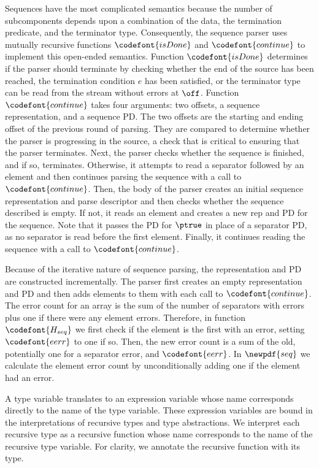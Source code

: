 Sequences have the most complicated semantics because the number of
subcomponents depends upon a combination of the data, the termination
predicate, and the terminator type. Consequently, the sequence parser
uses mutually recursive functions $\codefont{isDone}$ and
$\codefont{continue}$ to implement this open-ended semantics.
Function $\codefont{isDone}$ determines if the parser should terminate
by checking whether the end of the source has been reached, the
termination condition $e$ has been satisfied, or the terminator type
can be read from the stream without errors at $\off$.  Function
$\codefont{continue}$ takes four arguments: two offsets, a sequence
representation, and a sequence PD.  The two offsets are the starting
and ending offset of the previous round of parsing. They are compared
to determine whether the parser is progressing in the source, a check
that is critical to ensuring that the parser terminates. Next, the
parser checks whether the sequence is finished, and if so, terminates.
Otherwise, it attempts to read a separator followed by an element and
then continues parsing the sequence with a call to
$\codefont{continue}$.
Then, the body of the parser creates an initial sequence
representation and parse descriptor and
then checks whether the sequence described is empty. If not, it reads
an element and creates a new rep and PD for the sequence.  Note that
it passes the PD for $\ptrue$ in place of a separator PD, as no
separator is read before the first element.  Finally, it continues
reading the sequence with a call to $\codefont{continue}$.

Because of the iterative nature of sequence parsing, the
representation and PD are constructed incrementally. The parser first
creates an empty representation and PD and then adds elements to them
with each call to $\codefont{continue}$. The error count for an array
is the sum of the number of separators with errors plus one if there
were any element errors. Therefore, in function ${\codefont{H_{seq}}}$
we first check if the element is the first with an error, setting
$\codefont{eerr}$ to one if so. Then, the new error count is a sum of
the old, potentially one for a separator error, and $\codefont{eerr}$.
In $\newpdf{seq}$ we calculate the element error count by
unconditionally adding one if the element had an error.

A type variable translates to an expression variable whose name
corresponds directly to the name of the type variable. These
expression variables are bound in the interpretations of recursive
types and type abstractions. We interpret each recursive type as a
recursive function whose name corresponds to the name of the recursive
type variable. For clarity, we annotate the recursive function with its
type.

